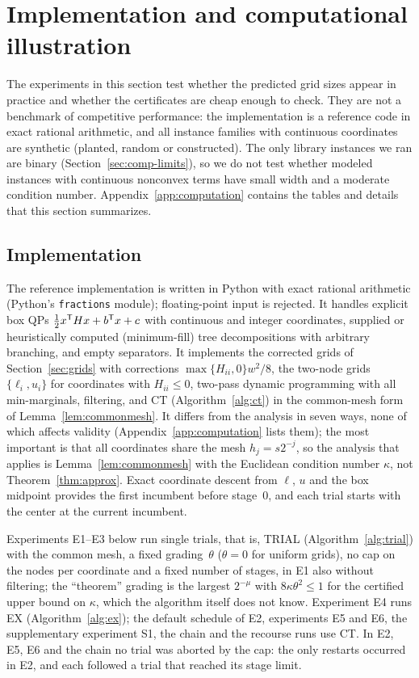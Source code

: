 \section{Implementation and computational illustration}\label{sec:computation}

The experiments in this section test whether the predicted grid sizes appear
in practice and whether the certificates are cheap enough to check. They are
not a benchmark of competitive performance: the implementation is a reference
code in exact rational arithmetic, and all instance families with continuous
coordinates are synthetic (planted, random or constructed). The only library
instances we ran are binary (Section~\ref{sec:comp-limits}), so we do not test
whether modeled instances with continuous nonconvex terms have small width
and a moderate condition number. Appendix~\ref{app:computation} contains the
tables and details that this section summarizes.

\subsection{Implementation}\label{sec:comp-impl}
The reference implementation is written in Python with exact rational
arithmetic (Python's \texttt{fractions} module); floating-point input is
rejected. It handles explicit box QPs $\frac12x^\mathsf T Hx+b^\mathsf T x+c$ with continuous
and integer coordinates, supplied or heuristically computed (minimum-fill)
tree decompositions with arbitrary branching, and empty separators. It
implements the corrected grids of Section~\ref{sec:grids} with corrections
$\max\{H_{ii},0\}w^2/8$, the two-node grids $\{\ell_i,u_i\}$ for coordinates
with $H_{ii}\le0$, two-pass dynamic programming with all min-marginals,
filtering, and CT (Algorithm~\ref{alg:ct}) in the common-mesh form of
Lemma~\ref{lem:commonmesh}. It differs from the analysis in seven ways, none
of which affects validity (Appendix~\ref{app:computation} lists them); the
most important is that all coordinates share the mesh $h_j=s2^{-j}$, so the
analysis that applies is Lemma~\ref{lem:commonmesh} with the Euclidean
condition number $\kappa$, not Theorem~\ref{thm:approx}. Exact coordinate
descent from $\ell$, $u$ and the box midpoint provides the first incumbent
before stage~$0$, and each trial starts with the center at the current
incumbent.

Experiments E1--E3 below run single trials, that is, TRIAL
(Algorithm~\ref{alg:trial}) with the common mesh, a fixed grading~$\theta$
($\theta=0$ for uniform grids), no cap on the nodes per coordinate and a fixed
number of stages, in E1 also without filtering; the ``theorem'' grading is the
largest $2^{-\mu}$ with $8\kappa\theta^2\le1$ for the certified upper bound on
$\kappa$, which the algorithm itself does not know. Experiment E4 runs EX
(Algorithm~\ref{alg:ex}); the
default schedule of E2, experiments E5 and E6, the supplementary experiment
S1, the chain and the recourse runs use CT. In E2, E5, E6 and the chain no
trial was aborted by the cap: the only restarts occurred in E2, and each
followed a trial that reached its stage limit.

